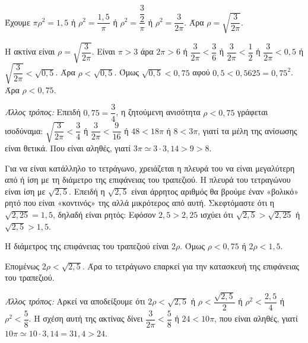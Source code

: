 
\begin{alist}
\item Έχουμε $\pi\rho^2 = 1,5$ ή $\rho^2 = \dfrac{1,5}{\pi}$ ή $\rho^2 = \dfrac{\dfrac{3}{2}}{\pi}$ ή $\rho^2 = \dfrac{3}{2\pi}$.
Άρα $\rho = \sqrt{\dfrac{3}{2\pi}}$.

\item Η ακτίνα είναι $\rho = \sqrt{\dfrac{3}{2\pi}}$.
Είναι $\pi > 3$ άρα $2\pi > 6$ ή $\dfrac{3}{2\pi} < \dfrac{3}{6}$ ή $\dfrac{3}{2\pi} < \dfrac{1}{2}$ ή $\dfrac{3}{2\pi} < 0,5$ ή $\sqrt{\dfrac{3}{2\pi}} < \sqrt{0,5}$.
Άρα $\rho < \sqrt{0,5}$.
Όμως $\sqrt{0,5} < 0,75$ αφού $0,5 < 0,5625 = 0,75^2$.
Άρα $\rho < 0,75$.

\textit{Άλλος τρόπος:}
Επειδή $0,75 = \dfrac{3}{4}$, η ζητούμενη ανισότητα $\rho < 0,75$ γράφεται ισοδύναμα:
$\sqrt{\dfrac{3}{2\pi}} < \dfrac{3}{4}$ ή $\dfrac{3}{2\pi} < \dfrac{9}{16}$ ή $48 < 18\pi$ ή $8 < 3\pi$, γιατί τα μέλη της ανίσωσης είναι θετικά.
Που είναι αληθές, γιατί $3\pi \simeq 3 \cdot 3,14 > 9 > 8$.

\item Για να είναι κατάλληλο το τετράγωνο, χρειάζεται η πλευρά του να είναι μεγαλύτερη από ή ίση με τη διάμετρο της επιφάνειας του τραπεζιού.
Η πλευρά του τετραγώνου είναι ίση με $\sqrt{2,5}$.
Επειδή η $\sqrt{2,5}$ είναι άρρητος αριθμός θα βρούμε έναν «βολικό» ρητό που είναι «κοντινός» της αλλά μικρότερος από αυτή. Σκεφτόμαστε ότι η $\sqrt{2,25} = 1,5$, δηλαδή είναι ρητός:
Εφόσον $2,5 > 2,25$ ισχύει ότι $\sqrt{2,5} > \sqrt{2,25}$ ή $\sqrt{2,5} > 1,5$.

Η διάμετρος της επιφάνειας του τραπεζιού είναι $2\rho$.
Όμως $\rho < 0,75$ ή $2\rho < 1,5$.

Επομένως $2\rho < \sqrt{2,5}$.
Άρα το τετράγωνο επαρκεί για την κατασκευή της επιφάνειας του τραπεζιού.

\textit{Άλλος τρόπος:}
Αρκεί να αποδείξουμε ότι $2\rho < \sqrt{2,5}$ ή $\rho < \dfrac{\sqrt{2,5}}{2}$ ή $\rho^2 < \dfrac{2,5}{4}$ ή $\rho^2 < \dfrac{5}{8}$.
Η σχέση αυτή της ακτίνας δίνει $\dfrac{3}{2\pi} < \dfrac{5}{8}$ ή $24 < 10\pi$, που είναι αληθές, γιατί $10\pi \simeq 10 \cdot 3,14 = 31,4 > 24$.
\end{alist}


